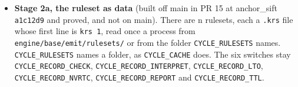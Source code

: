\begin{enumerate}
\begin{itemize}
\begin{enumerate}
\begin{itemize}
\item \textbf{Stage 2a, the ruleset as data} (built off main in PR 15 at anchor\_\allowbreak{}sift \texttt{a1c12d9} and proved, and not on main). There are n rulesets, each a \texttt{.\allowbreak{}krs} file whose first line is \texttt{krs 1}, read once a process from \texttt{engine/\allowbreak{}base/\allowbreak{}emit/\allowbreak{}rulesets/\allowbreak{}} or from the folder \texttt{CYCLE\_\allowbreak{}RULESETS} names. \texttt{CYCLE\_\allowbreak{}RULESETS} names a folder, as \texttt{CYCLE\_\allowbreak{}CACHE} does. The six switches stay \texttt{CYCLE\_\allowbreak{}RECORD\_\allowbreak{}CHECK}, \texttt{CYCLE\_\allowbreak{}RECORD\_\allowbreak{}INTERPRET}, \texttt{CYCLE\_\allowbreak{}RECORD\_\allowbreak{}LTO}, \texttt{CYCLE\_\allowbreak{}RECORD\_\allowbreak{}NVRTC}, \texttt{CYCLE\_\allowbreak{}RECORD\_\allowbreak{}REPORT} and \texttt{CYCLE\_\allowbreak{}RECORD\_\allowbreak{}TTL}.


\end{itemize}
\end{enumerate}
\end{itemize}
\end{enumerate}
